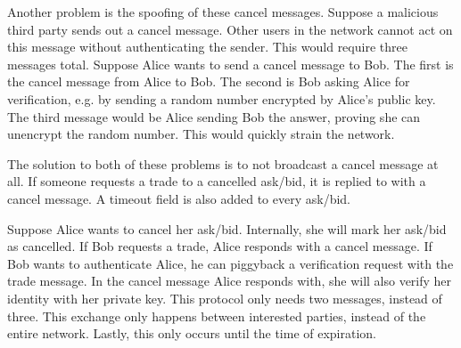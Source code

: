 Another problem is the spoofing of these cancel messages.
Suppose a malicious third party sends out a cancel message.
Other users in the network cannot act on this message without authenticating the sender.
This would require three messages total.
Suppose Alice wants to send a cancel message to Bob.
The first is the cancel message from Alice to Bob.
The second is Bob asking Alice for verification, e.g.
by sending a random number encrypted by Alice's public key.
The third message would be Alice sending Bob the answer, proving she can unencrypt the random number.
This would quickly strain the network.


The solution to both of these problems is to not broadcast a cancel message at all.
If someone requests a trade to a cancelled ask/bid, it is replied to with a cancel message.
A timeout field is also added to every ask/bid.


Suppose Alice wants to cancel her ask/bid.
Internally, she will mark her ask/bid as cancelled.
If Bob requests a trade, Alice responds with a cancel message.
If Bob wants to authenticate Alice, he can piggyback a verification request with the trade message.
In the cancel message Alice responds with, she will also verify her identity with her private key.
This protocol only needs two messages, instead of three.
This exchange only happens between interested parties, instead of the entire network.
Lastly, this only occurs until the time of expiration.